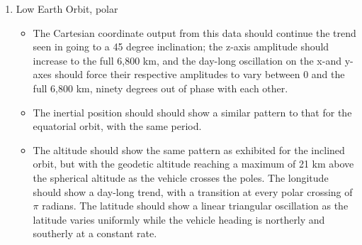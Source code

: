 \begin{description}
\begin{enumerate}
\item {Low Earth Orbit, polar}
\begin{itemize}
\item{}The Cartesian coordinate output from this data should continue the trend seen in going to a 45 degree inclination; the z-axis amplitude should increase to the full 6,800 km, and the day-long oscillation on the x-and y-axes should force their respective amplitudes to vary between 0 and the full 6,800 km, ninety degrees out of phase with each other.
\item{}The inertial position should should show a similar pattern to that for the equatorial orbit, with the same period.
\item{}The altitude should show the same pattern as exhibited for the inclined orbit, but with the geodetic altitude reaching a maximum of 21 km above the spherical altitude as the vehicle crosses the poles.
The longitude should show a day-long trend, with a transition at every polar crossing of $\pi$ radians.
The latitude should show a linear triangular oscillation as the latitude varies uniformly while the vehicle heading is northerly and southerly at a constant rate.
\end{itemize}


\end{enumerate}
\end{description}
